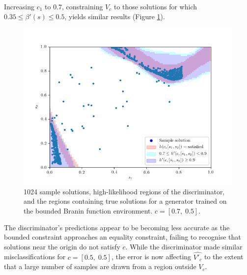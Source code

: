 \documentclass[../../main.tex]{subfiles}
\begin{document}
Increasing $c_1$ to $0.7$, constraining $V_c$ to those solutions for which $0.35\le\beta'(s)\le0.5$, yields similar results (Figure \ref{fig:equality07}).
\begin{figure}[H]
    \begin{center}
    \includegraphics[width=\textwidth]{equality07}
    \caption[Samples from a more specific Branin constraint]{
        1024 sample solutions, high-likelihood regions of the discriminator, and the regions containing true solutions for a generator trained on the bounded Branin function environment.
        $c=[0.7,\;0.5]$.
    }
    \label{fig:equality07}
    \end{center}
\end{figure}
The discriminator's predictions appear to be becoming less accurate as the bounded constraint approaches an equality constraint, failing to recognise that solutions near the origin do not satisfy $c$.
While the discriminator made similar misclassifications for $c=[0.5,\;0.5]$, the error is now affecting $\hat{V'_c}$ to the extent that a large number of samples are drawn from a region outside $V_c$.
\end{document}
